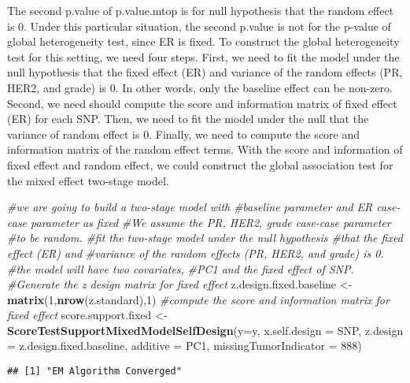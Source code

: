 \documentclass[11pt,]{article}
\newenvironment{Shaded}{\begin{snugshade}}{\end{snugshade}}
\newcommand{\CommentTok}[1]{\textcolor[rgb]{0.56,0.35,0.01}{\textit{#1}}}
\newcommand{\DataTypeTok}[1]{\textcolor[rgb]{0.13,0.29,0.53}{#1}}
\newcommand{\DecValTok}[1]{\textcolor[rgb]{0.00,0.00,0.81}{#1}}
\newcommand{\KeywordTok}[1]{\textcolor[rgb]{0.13,0.29,0.53}{\textbf{#1}}}
\newcommand{\NormalTok}[1]{#1}
\newcommand{\StringTok}[1]{\textcolor[rgb]{0.31,0.60,0.02}{#1}}
\begin{document}
The second p.value of p.value.mtop is for null hypothesis that the
random effect is 0. Under this particular situation, the second p.value
is not for the p-value of global heterogeneity test, since ER is fixed.
To construct the global heterogeneity test for this setting, we need
four steps. First, we need to fit the model under the null hypothesis
that the fixed effect (ER) and variance of the random effects (PR, HER2,
and grade) is 0. In other words, only the baseline effect can be
non-zero. Second, we need should compute the score and information
matrix of fixed effect (ER) for each SNP. Then, we need to fit the model
under the null that the variance of random effect is 0. Finally, we need
to compute the score and information matrix of the random effect terms.
With the score and information of fixed effect and random effect, we
could construct the global association test for the mixed effect
two-stage model.

\begin{Shaded}
\begin{Highlighting}[]
\CommentTok{#we are going to build a two-stage model with }
\CommentTok{#baseline parameter and ER case-case parameter as fixed}
\CommentTok{#We assume the PR, HER2, grade case-case parameter }
\CommentTok{#to be random.}
\CommentTok{#fit the two-stage model under the null hypothesis}
\CommentTok{#that the fixed effect (ER) and }
\CommentTok{#variance of the random effects (PR, HER2, and grade) is 0.}
\CommentTok{#the model will have two covariates, }
\CommentTok{#PC1 and the fixed effect of SNP.}
\CommentTok{#Generate the z design matrix for fixed effect}
\NormalTok{z.design.fixed.baseline <-}\StringTok{ }\KeywordTok{matrix}\NormalTok{(}\DecValTok{1}\NormalTok{,}\KeywordTok{nrow}\NormalTok{(z.standard),}\DecValTok{1}\NormalTok{)}
\CommentTok{#compute the score and information matrix for fixed effect}
\NormalTok{score.support.fixed <-}\StringTok{ }\KeywordTok{ScoreTestSupportMixedModelSelfDesign}\NormalTok{(}\DataTypeTok{y=}\NormalTok{y,}
                        \DataTypeTok{x.self.design  =}\NormalTok{ SNP,}
                        \DataTypeTok{z.design =}\NormalTok{ z.design.fixed.baseline,}
                        \DataTypeTok{additive =}\NormalTok{ PC1,}
                        \DataTypeTok{missingTumorIndicator =} \DecValTok{888}\NormalTok{)}
\end{Highlighting}
\end{Shaded}

\begin{verbatim}
## [1] "EM Algorithm Converged"
\end{verbatim}
\end{document}
